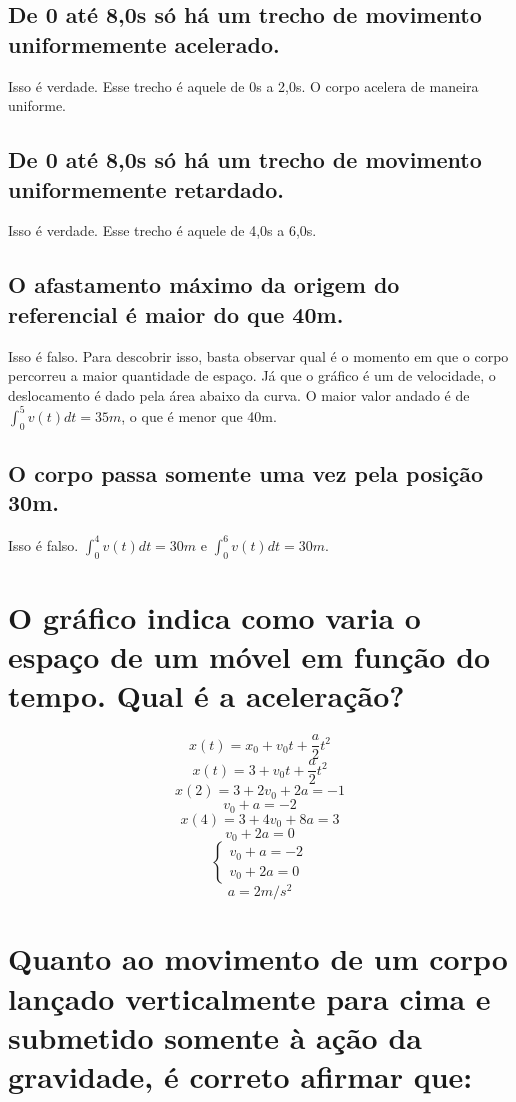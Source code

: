 \documentclass{article}
\begin{document}
    \subsection{De 0 até 8,0s só há um trecho de movimento uniformemente acelerado.}
        \hspace{\parindent} Isso é verdade. Esse trecho é aquele de 0s a 2,0s. O corpo acelera de maneira uniforme.
    \subsection{De 0 até 8,0s só há um trecho de movimento uniformemente retardado.}
        \hspace{\parindent} Isso é verdade. Esse trecho é aquele de 4,0s a 6,0s.
    \subsection{O afastamento máximo da origem do referencial é maior do que 40m.}
        \hspace{\parindent} Isso é falso. Para descobrir isso, basta observar qual é o momento em que o corpo percorreu a maior quantidade de espaço. Já que o gráfico é um de velocidade, o deslocamento é dado pela área abaixo da curva. O maior valor andado é de \(\int_0^5v(t)dt=35m\), o que é menor que 40m.
    \subsection{O corpo passa somente uma vez pela posição 30m.}
        \hspace{\parindent} Isso é falso. \(\int_0^4v(t)dt=30m\) e \(\int_0^6v(t)dt=30m\).

\section{O gráfico indica como varia o espaço de um móvel em função do tempo. Qual é a aceleração?}
    \[x(t)=x_0+v_0t+\frac{a}{2}t^2\]
    \[x(t)=3+v_0t+\frac{a}{2}t^2\]
    \[x(2)=3+2v_0+2a=-1\]
    \[v_0+a=-2\]
    \[x(4)=3+4v_0+8a=3\]
    \[v_0+2a=0\]
    $$ \left\{
        \begin{array}{lr}
            v_0+a=-2\\
            v_0+2a = 0
        \end{array}
    \right. $$
    \[a=2m/s^2\]

\section{Quanto ao movimento de um corpo lançado verticalmente para cima e submetido somente à ação da gravidade, é correto afirmar que:}
\end{document}
